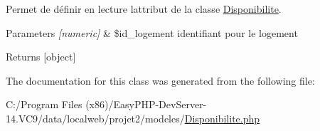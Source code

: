 Permet de définir en lecture l\textquotesingle{}attribut de la classe \hyperlink{class_disponibilite}{Disponibilite}. 


\begin{DoxyParams}{Parameters}
{\em \mbox{[}numeric\mbox{]}} & \$id\+\_\+logement identifiant pour le logement \\
\hline
\end{DoxyParams}
\begin{DoxyReturn}{Returns}
\mbox{[}object\mbox{]} 
\end{DoxyReturn}


The documentation for this class was generated from the following file\+:\begin{DoxyCompactItemize}
\item 
C\+:/\+Program Files (x86)/\+Easy\+P\+H\+P-\/\+Dev\+Server-\/14.\+V\+C9/data/localweb/projet2/modeles/\hyperlink{_disponibilite_8php}{Disponibilite.\+php}\end{DoxyCompactItemize}
